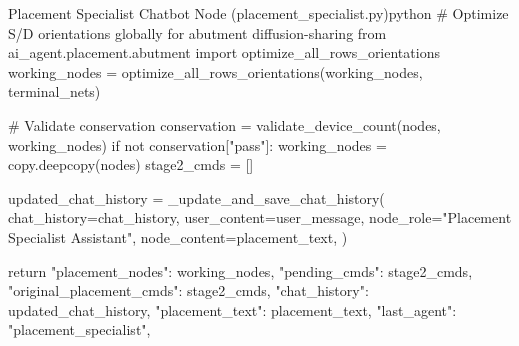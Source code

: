 \begin{thesiscode}{Placement Specialist Chatbot Node (placement\_specialist.py)\label{lst:placement_specialist_chatbot}}{python}
    # Optimize S/D orientations globally for abutment diffusion-sharing
    from ai_agent.placement.abutment import optimize_all_rows_orientations
    working_nodes = optimize_all_rows_orientations(working_nodes, terminal_nets)
    
    # Validate conservation
    conservation = validate_device_count(nodes, working_nodes)
    if not conservation["pass"]:
        working_nodes = copy.deepcopy(nodes)
        stage2_cmds   = []

    updated_chat_history = _update_and_save_chat_history(
        chat_history=chat_history, user_content=user_message,
        node_role="Placement Specialist Assistant", node_content=placement_text,
    )

    return {
        "placement_nodes":         working_nodes,
        "pending_cmds":            stage2_cmds,
        "original_placement_cmds": stage2_cmds,
        "chat_history":            updated_chat_history,
        "placement_text":          placement_text,
        "last_agent":              "placement_specialist",
    }
\end{thesiscode}

